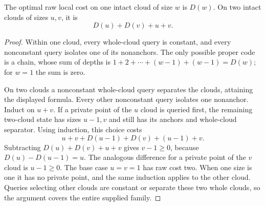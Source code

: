 \begin{lemma}\label{lem:uniform-cloud-local}
The optimal raw local cost on one intact cloud of size $w$ is
$D(w)$. On two intact clouds of sizes $u,v$, it is
\[
 D(u)+D(v)+u+v.
\]
\end{lemma}
\begin{proof}
Within one cloud, every whole-cloud query is constant, and every
nonconstant query isolates one of its nonanchors. The only possible
proper code is a chain, whose sum of depths is
$1+2+\cdots+(w-1)+(w-1)=D(w)$; for $w=1$ the sum is zero.

On two clouds a nonconstant whole-cloud query separates the
clouds, attaining the displayed formula. Every other nonconstant
query isolates one nonanchor. Induct on $u+v$.
If a private point of the $u$ cloud is queried first, the
remaining two-cloud state has sizes $u-1,v$ and still has its
anchors and whole-cloud separator. Using induction, this choice
costs
\[
 u+v+D(u-1)+D(v)+(u-1)+v.
\]
Subtracting $D(u)+D(v)+u+v$ gives $v-1\ge0$, because
$D(u)-D(u-1)=u$.
The analogous difference for a private point of the $v$ cloud
is $u-1\ge0$. The base case $u=v=1$ has raw cost two.
When one size is one it has no private point, and the same
induction applies to the other cloud. Queries selecting other
clouds are constant or separate these two whole clouds, so the
argument covers the entire supplied family.
\end{proof}

